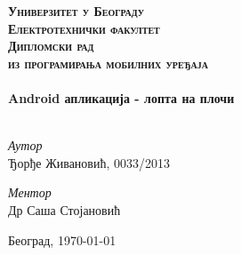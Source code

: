 

\begin{titlepage}

\begin{center}



\textsc{\Huge \textbf{Универзитет у Београду}} \\[1cm]
\textsc{\Huge \textbf{Електротехнички факултет}}\\[5cm]

\textsc{\Huge \textbf{Дипломски рад }}\\[0.5cm]
\textsc{\large{\textbf{из програмирања мобилних уређаја}}}
\\[4cm]

\HRule \\[0.8cm]
{ \Huge \bfseries Android апликација - лопта на плочи}\\[0.4cm]

\HRule \\[5cm]

\begin{minipage}{0.55\textwidth}
\begin{flushleft} \large
\emph{Аутор}\\
Ђорђе Живановић, 0033/2013\\
\end{flushleft}
\end{minipage}
\begin{minipage}{0.4\textwidth}
\begin{flushright} \large
\emph{Ментор} \\
Др Саша Стојановић
\end{flushright}
\end{minipage}



\vfill

{\large Београд, \today}

\end{center}

\end{titlepage}